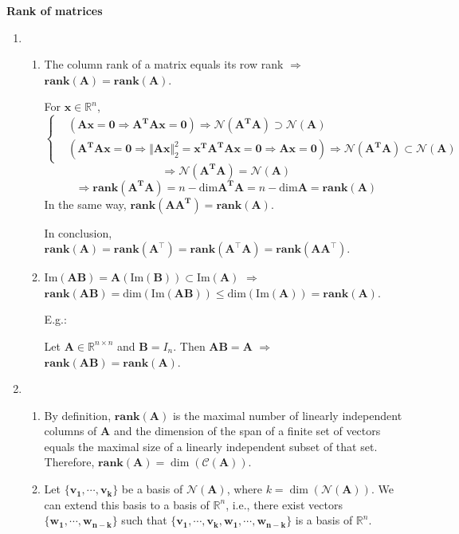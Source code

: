 \documentclass[11pt,letter,notitlepage]{article}
\newcommand{\rank}[1]{ \textbf{rank}  (#1)  }
\theoremstyle{definition}
\begin{document}
\begin{solution}\textbf{Rank of matrices}
	\begin{enumerate}
		\item 
		\begin{enumerate}
			\item 
			The column rank of a matrix equals its row rank $\Longrightarrow$ $\rank{\mathbf{A}} = \rank{\mathbf{A}}$.

			For $\mathbf{x} \in \mathbb{R}^n$,
			\begin{equation}
				\left\{
				\begin{aligned}
					\nonumber
				&(\mathbf{Ax} = \mathbf{0} \Longrightarrow \mathbf{A^T Ax} = \mathbf{0}) \Longrightarrow \mathcal{N}(\mathbf{A^T A}) \supset \mathcal{N}(\mathbf{A})\\
				&(\mathbf{A^T Ax} = \mathbf{0} \Longrightarrow \Vert \mathbf{Ax} \Vert_2^2 = \mathbf{x^T A^T Ax} = \mathbf{0} \Longrightarrow \mathbf{Ax} = \mathbf{0}) \Longrightarrow \mathcal{N}(\mathbf{A^T A}) \subset \mathcal{N}(\mathbf{A})
				\end{aligned}
				\right.
			\end{equation}
			\[
			\Longrightarrow
			\mathcal{N}(\mathbf{A^T A}) = \mathcal{N}(\mathbf{A})
			\]
			\[
			\Longrightarrow
			\rank{\mathbf{A^T A}}
			=
			n - \text{dim}\mathbf{A^T A}
			=
			n - \text{dim}\mathbf{A}
			=
			\rank{\mathbf{A}}
			\]
			In the same way, $\rank{\mathbf{A A^T}} = \rank{\mathbf{A}}$.

			In conclusion, $\rank{\mathbf{A}} = \rank{\mathbf{A}^{\top}} = \rank{\mathbf{A}^{\top}\mathbf{A}}= \rank{\mathbf{A}\mathbf{A}^{\top}}$.
			\item 
			$\text{Im}(\mathbf{AB}) = \mathbf{A}(\text{Im}(\mathbf{B})) \subset \text{Im}(\mathbf{A})$ $\Longrightarrow$ $\rank{\mathbf{AB}} = \text{dim}(\text{Im}(\mathbf{AB})) \leq \text{dim}(\text{Im}(\mathbf{A})) = \rank{\mathbf{A}}$.

			E.g.:
			
			Let $\mathbf{A}\in \mathbb{R}^{n\times n}$ and $\mathbf{B} = I_{n}$. Then $\mathbf{AB} = \mathbf{A}$ $\Longrightarrow$ $\rank{\mathbf{A}\mathbf{B}} = \rank{\mathbf{A}}$.
		\end{enumerate}
		\item 
		\begin{enumerate}
			\item 
			By definition, $\rank{\mathbf{A}}$ is the maximal number of linearly independent columns of $\mathbf{A}$ and the dimension of the span of a finite set of vectors equals the maximal size of a linearly independent subset of that set. Therefore, $\rank{\mathbf{A}} = \dim(\mathcal{C}(\mathbf{A}))$.
			\item 
			Let $\{\mathbf{v_1}, \cdots, \mathbf{v_k}\}$ be a basis of $\mathcal{N}(\mathbf{A})$, where $k = \dim(\mathcal{N}(\mathbf{A}))$. We can extend this basis to a basis of $\mathbb{R}^n$, i.e., there exist vectors $\{\mathbf{w_1}, \cdots, \mathbf{w_{n-k}}\}$ such that $\{\mathbf{v_1}, \cdots, \mathbf{v_k}, \mathbf{w_1}, \cdots, \mathbf{w_{n-k}}\}$ is a basis of $\mathbb{R}^n$.


\end{enumerate}
\end{enumerate}
\end{solution}
\end{document}
